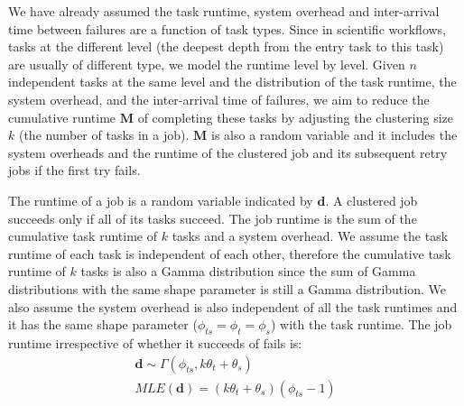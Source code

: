 \documentclass{IOS-Book-Article}
\begin{document}
We have already assumed the task runtime, system overhead and inter-arrival time between failures are a function of task types. Since in scientific workflows, tasks at the different level (the deepest depth from the entry task to this task) are usually of different type, we model the runtime level by level. Given $n$ independent tasks at the same level and the distribution of the task runtime, the system overhead, and the inter-arrival time of failures, we aim to reduce the cumulative runtime $\bm M$ of completing these tasks by adjusting the clustering size $k$ (the number of tasks in a job). 
$\bm M$ is also a random variable and it includes the system overheads and the runtime of the clustered job and its subsequent retry jobs if the first try fails. 

The runtime of a job is a random variable indicated by $\bm d$. A clustered job succeeds only if all of its tasks succeed. The job runtime is the sum of the cumulative task runtime of $k$ tasks and a system overhead. We assume the task runtime of each task is independent of each other, therefore the cumulative task runtime of $k$ tasks is also a Gamma distribution since the sum of Gamma distributions with the same shape parameter is still a Gamma distribution. We also assume the system overhead is also independent of all the task runtimes and it has the same shape parameter ($\phi_{ts}=\phi_{t}=\phi_{s}$) with the task runtime. 
The job runtime irrespective of whether it succeeds of fails is:
\begin{eqnarray}
\displaystyle
\bm{d}\sim\Gamma(\phi_{ts}, k\theta_t+\theta_s)\\
MLE(\bm{d})=\displaystyle{(k\theta_t+\theta_s) }{(\phi_{ts}-1)}
\label{eq:N}
\end{eqnarray}
\end{document}
